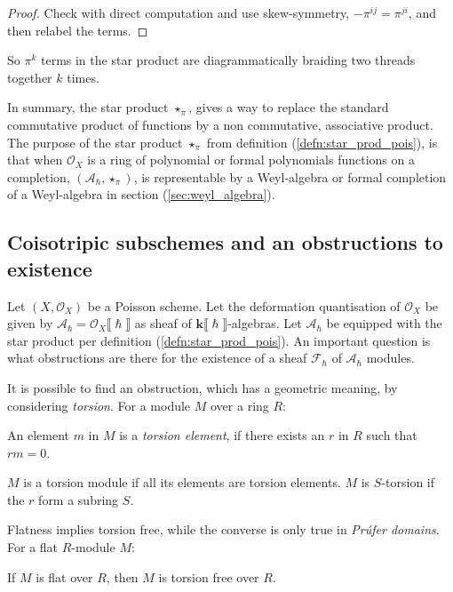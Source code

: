     \begin{proof}
    Check with direct computation and use skew-symmetry, \( -\pi^{ij} = \pi^{ji}\), and then relabel the terms.
    \end{proof}
    
    So \( \pi^k\) terms in the star product are diagrammatically braiding two threads together \( k \) times.
    
    
    In summary, the star product \(\star_{\pi}\), gives a way to replace the standard commutative product of functions by a non commutative, associative product. %
    The purpose of the star product \( \star_{\pi}\) from definition (\ref{defn:star_prod_pois}), is that when \( \mathcal{O}_X\) is a ring of polynomial or formal polynomials functions on a completion, \((\mathcal{A}_{\hslash}, \star_{\pi})\), is representable by a Weyl-algebra or formal completion of a Weyl-algebra in section (\ref{sec:weyl_algebra}). 
    

    
    \subsection{Coisotripic subschemes and an obstructions to existence}
    
    Let \((X,\mathcal{O}_X)\) be a Poisson scheme. Let the deformation quantisation of \(\mathcal{O}_X\) be given by \(\mathcal{A}_{\hslash} = \mathcal{O}_X\lBrack \hslash \rBrack\) as sheaf of \( \mathbf{k} \lBrack \hslash \rBrack\)-algebras. Let \( \mathcal{A}_{\hslash}\) be equipped with the star product per definition (\ref{defn:star_prod_pois}).  An important question is what obstructions are there for the existence of a sheaf \(\mathcal{F}_\hslash\) of \( \mathcal{A}_{\hslash}\) modules. 
    
    It is possible to find an obstruction, which has a geometric meaning, by considering \emph{torsion}. For a module \(M\) over a ring \(R\):
    \begin{defn} An element \(m\) in \(M\) is a \emph{torsion element}, if there exists an \(r \) in \(R\) such that \(rm=0\).
    \end{defn}
    \(M\) is a torsion module if all its elements are torsion elements. \(M\) is \(S\)-torsion if the \(r\) form a subring \(S\). 
    
    Flatness implies torsion free, while the converse is only true in \emph{Pr\'ufer domains}. For a flat \(R\)-module \(M\):
    \begin{lem}
    If \(M\) is flat over \(R\), then \(M\) is torsion free over \(R\).
    \end{lem}
    
